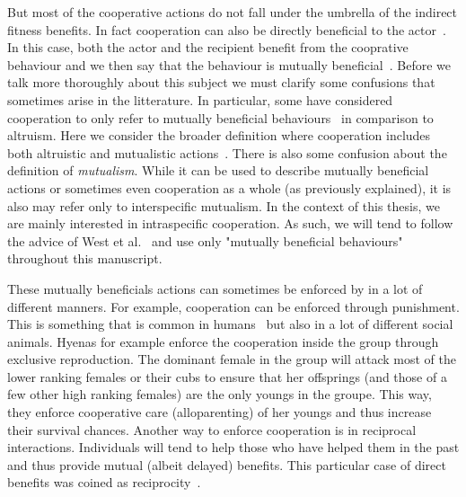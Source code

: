     But most of the cooperative actions do not fall under the umbrella of the indirect fitness benefits. In fact cooperation can also be directly beneficial to the actor~\parencite{Leimar2010}. In this case, both the actor and the recipient benefit from the cooprative behaviour and we then say that the behaviour is mutually beneficial~\parencite{West2007a}. Before we talk more thoroughly about this subject we must clarify some confusions that sometimes arise in the litterature. In particular, some have considered cooperation to only refer to mutually beneficial behaviours~\parencite{Trivers1985, Lehmann2006} in comparison to altruism. Here we consider the broader definition where cooperation includes both altruistic and mutualistic actions~\parencite{West2007a}. There is also some confusion about the definition of \emph{mutualism}. While it can be used to describe mutually beneficial actions or sometimes even cooperation as a whole (as previously explained), it is also may refer only to interspecific mutualism. In the context of this thesis, we are mainly interested in intraspecific cooperation. As such, we will tend to follow the advice of West et al.~\parencite{West2007} and use only "mutually beneficial behaviours" throughout this manuscript.

    These mutually beneficials actions can sometimes be enforced by in a lot of different manners. For example, cooperation can be enforced through punishment. This is something that is common in humans~\parencite{Fehr2002} but also in a lot of different social animals. Hyenas for example enforce the cooperation inside the group through exclusive reproduction. The dominant female in the group will attack most of the lower ranking females or their cubs to ensure that her offsprings (and those of a few other high ranking females) are the only youngs in the groupe. This way, they enforce cooperative care (alloparenting) of her youngs and thus increase their survival chances. Another way to enforce cooperation is in reciprocal interactions. Individuals will tend to help those who have helped them in the past and thus provide mutual (albeit delayed) benefits. This particular case of direct benefits was coined as reciprocity~\parencite{Trivers1971, Lehmann2006}.


